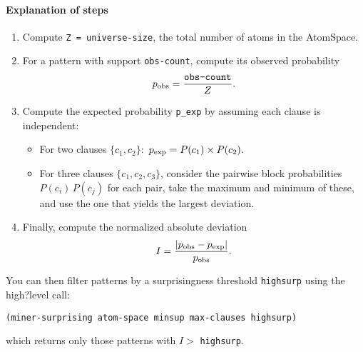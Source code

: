 \paragraph{Explanation of steps}

\begin{enumerate}
  \item Compute \texttt{Z = universe-size}, the total number of atoms in the AtomSpace.
  \item For a pattern with support \texttt{obs-count}, compute its observed probability
        \[
          p_{\rm obs} = \frac{\texttt{obs-count}}{Z}.
        \]
  \item Compute the expected probability \texttt{p\_exp} by assuming each clause is independent:
  \begin{itemize}
    \item For two clauses \(\{c_1,c_2\}\):
      \(\,p_{\rm exp} = P(c_1)\times P(c_2).\)
    \item For three clauses \(\{c_1,c_2,c_3\}\), consider the pairwise block probabilities
      \(P(c_i)\,P(c_j)\) for each pair, take the maximum and minimum of these, and use the one that yields the largest deviation.
  \end{itemize}
  \item Finally, compute the normalized absolute deviation
        \[
          I = \frac{\lvert p_{\rm obs} - p_{\rm exp}\rvert}{p_{\rm obs}}.
        \]
\end{enumerate}

You can then filter patterns by a surprisingness threshold \texttt{highsurp} using the high?level call:
\begin{verbatim}
(miner-surprising atom-space minsup max-clauses highsurp)
\end{verbatim}
which returns only those patterns with \(I >\) \texttt{highsurp}.